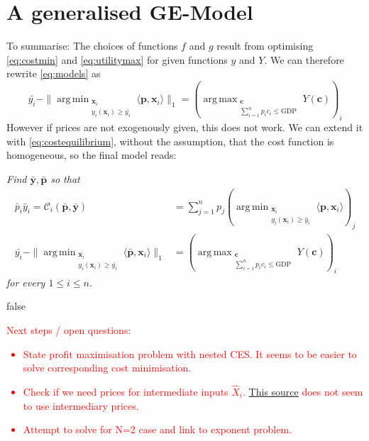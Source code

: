 \documentclass{article}
\newcommand{\costf}[1]{\mathscr{C}_#1}
\DeclareMathOperator*{\argmax}{arg\,max}
\DeclareMathOperator*{\argmin}{arg\,min}
\begin{document}
\section{A generalised GE-Model}

To summarise:
The choices of functions $f$ and $g$ result from optimising \eqref{eq:costmin} and \eqref{eq:utilitymax} for given functions $y$ and $Y$. 
We can therefore rewrite \eqref{eq:models} as 
\begin{equation*}
  \bar {y_i} -\| \argmin_{\substack{\mathbf x_i \\  y_i(\mathbf x_i) \geq \bar {y_i}}} \langle \mathbf p, \mathbf x_{i} \rangle \|_1 = \left( \argmax_{\substack{\mathbf c \\ \sum_{i=1}^n p_i c_i \leq \text{GDP}}} Y(\mathbf c) \right)_i
\end{equation*}
However if prices are not exogenously given, this does not work. We can extend it with \eqref{eq:costequilibrium}, without the assumption, that the cost function is homogeneous, so the final model reads:

\textit{Find $\bar {\mathbf y}, \bar{\mathbf p}$ so that}
\begin{align*}
  \bar p_i \bar y_i = \costf{i} (\bar {\mathbf p}, \bar {\mathbf y}) &= \sum_{j=1}^n p_j \left( \argmin_{\substack{\mathbf x_i \\ y_i(\mathbf x_i) \geq \bar{y}_i}} \langle \mathbf p,\mathbf x_i \rangle \right)_j \\
  \bar {y_i} -\| \argmin_{\substack{\mathbf x_i \\  y_i(\mathbf x_i) \geq \bar {y_i}}} \langle \bar{ \mathbf p}, \mathbf x_{i} \rangle \|_1 &= \left( \argmax_{\substack{\mathbf c \\ \sum_{i=1}^n p_i c_i \leq \text{GDP} }} Y(\mathbf c) \right)_i
\end{align*}
\textit{for every $1 \leq i \leq n$}.



\if false
\textcolor{red}{
Next steps / open questions:
\begin{itemize}
    \item State profit maximisation problem with nested CES. It seems to be easier to solve corresponding cost minimisation.
    \item Check if we need prices for intermediate inputs $\hat{X}_i$. \href{https://fanwangecon.github.io/R4Econ/math/func_prod/htmlpdfr/fs_nested_CES.html}{This source} does not seem to use intermediary prices.
    \item Attempt to solve for N=2 case and link to exponent problem.
\end{itemize}
}
\fi

\printbibliography
\end{document}
